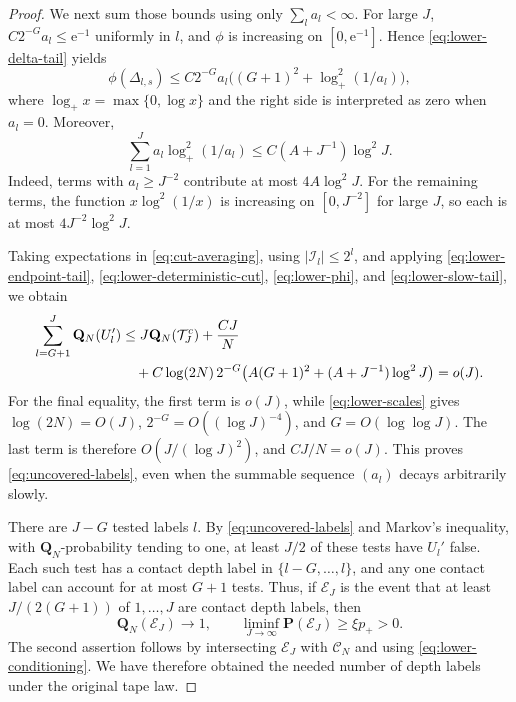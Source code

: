 \begin{proof}
We next sum those bounds using only $\sum_l a_l<\infty$.  For large $J$,
$C2^{-G}a_l\le\mathrm e^{-1}$ uniformly in $l$, and $\phi$ is increasing on
$[0,\mathrm e^{-1}]$.  Hence \eqref{eq:lower-delta-tail} yields
\begin{equation}\label{eq:lower-phi}
 \phi(\Delta_{l,s})
 \le C2^{-G}a_l\bigl((G+1)^2+\log_+^2(1/a_l)\bigr),
\end{equation}
where $\log_+ x=\max\{0,\log x\}$ and the right side is interpreted as zero
when $a_l=0$.  Moreover,
\begin{equation}\label{eq:lower-slow-tail}
 \sum_{l=1}^J a_l\log_+^2(1/a_l)
 \le C(A+J^{-1})\log^2 J.
\end{equation}
Indeed, terms with $a_l\ge J^{-2}$ contribute at most $4A\log^2 J$.
For the remaining terms, the function $x\log^2(1/x)$ is increasing on
$[0,J^{-2}]$ for large $J$, so each is at most $4J^{-2}\log^2 J$.

Taking expectations in \eqref{eq:cut-averaging}, using
$|\mathcal I_l|\le2^l$, and applying
\eqref{eq:lower-endpoint-tail}, \eqref{eq:lower-deterministic-cut},
\eqref{eq:lower-phi}, and \eqref{eq:lower-slow-tail}, we obtain
\begin{align}
 \sum_{l=G+1}^J\mathbf Q_N(U_l')
 &\le J\mathbf Q_N(\mathcal T_J^c)+\frac{CJ}{N}\notag\\
 &\quad+C\log(2N)\,2^{-G}
       \bigl(A(G+1)^2+(A+J^{-1})\log^2 J\bigr)
 =o(J).\label{eq:lower-uncovered-bound}
\end{align}
For the final equality, the first term is $o(J)$, while
\eqref{eq:lower-scales} gives $\log(2N)=O(J)$,
$2^{-G}=O((\log J)^{-4})$, and $G=O(\log\log J)$.
The last term is therefore $O(J/(\log J)^2)$, and $CJ/N=o(J)$.  This proves
\eqref{eq:uncovered-labels}, even when the summable sequence $(a_l)$ decays
arbitrarily slowly.

There are $J-G$ tested labels $l$.  By \eqref{eq:uncovered-labels} and Markov's
inequality, with $\mathbf Q_N$-probability tending to one, at least $J/2$ of
these tests have $U_l'$ false.  Each such test has a contact depth label in
$\{l-G,\ldots,l\}$, and any one contact label can account for at most $G+1$
tests.  Thus, if $\mathcal E_J$ is the event that at least $J/(2(G+1))$ of
$1,\ldots,J$ are contact depth labels, then
\begin{equation}\label{eq:lower-unconditioning}
 \mathbf Q_N(\mathcal E_J)\longrightarrow1,
 \qquad
 \liminf_{J\to\infty}\mathbf P(\mathcal E_J)\ge\xi p_+>0.
\end{equation}
The second assertion follows by intersecting $\mathcal E_J$ with
$\mathcal C_N$ and using \eqref{eq:lower-conditioning}.  We have therefore
obtained the needed number of depth labels under the original tape law.


\end{proof}
